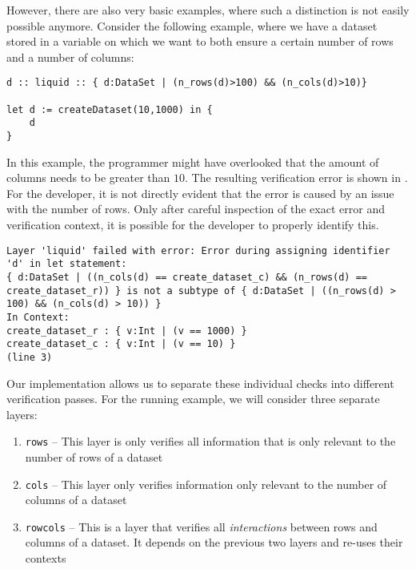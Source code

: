 However, there are also very basic examples, where such a distinction is not easily possible anymore. Consider the following example, where we have a dataset stored in a variable on which we want to both ensure a certain number of rows and a number of columns:

\begin{lstlisting}[caption={Small example of a dataset imposing restrictions on both rows and dimensions},label={lst:uc2_fail_monolithic}]
d :: liquid :: { d:DataSet | (n_rows(d)>100) && (n_cols(d)>10)}

let d := createDataset(10,1000) in {
	d
}
\end{lstlisting}

In this example, the programmer might have overlooked that the amount of columns needs to be greater than $10$. The resulting verification error is shown in . For the developer, it is not directly evident that the error is caused by an issue with the number of rows. Only after careful inspection of the exact error and verification context, it is possible for the developer to properly identify this. 

\begin{lstlisting}[caption={Verification error produced by \Cref{lst:uc2_fail_monolithic}}]
Layer 'liquid' failed with error: Error during assigning identifier 'd' in let statement:
{ d:DataSet | ((n_cols(d) == create_dataset_c) && (n_rows(d) == create_dataset_r)) } is not a subtype of { d:DataSet | ((n_rows(d) > 100) && (n_cols(d) > 10)) }
In Context:
create_dataset_r : { v:Int | (v == 1000) }
create_dataset_c : { v:Int | (v == 10) }
(line 3)
\end{lstlisting}

Our implementation allows us to separate these individual checks into different verification passes. For the running example, we will consider three separate layers:

\begin{enumerate}
	\item \texttt{rows} -- This layer is only verifies all information that is only relevant to the number of rows of a dataset
	\item \texttt{cols} -- This layer only verifies information only relevant to the number of columns of a dataset
	\item \texttt{rowcols} -- This is a layer that verifies all \textit{interactions} between rows and columns of a dataset. It depends on the previous two layers and re-uses their contexts
\end{enumerate}

